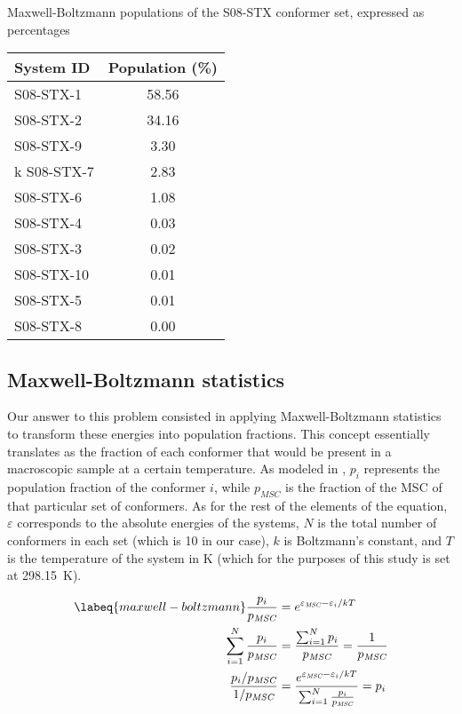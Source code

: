 \begin{margintable}
    \centering
    \caption[Maxwell-Boltzmann populations of S08-STX]{Maxwell-Boltzmann populations of the S08-STX conformer set, expressed as percentages}
    \begin{tabular}{@{}l
                       S[table-format=2.2]@{}}
        \toprule
        System ID & {Population (\si{\percent})} \\
        \midrule
        S08-STX-1 & 58.56 \\
        S08-STX-2 & 34.16 \\
        S08-STX-9 & 3.30 \\k
        S08-STX-7 & 2.83 \\
        S08-STX-6 & 1.08 \\
        S08-STX-4 & 0.03 \\
        S08-STX-3 & 0.02 \\
        S08-STX-10 & 0.01 \\
        S08-STX-5 & 0.01 \\
        S08-STX-8 & 0.00 \\
    \end{tabular}
\end{margintable}

\subsection{Maxwell-Boltzmann statistics}
Our answer to this problem consisted in applying Maxwell-Boltzmann statistics to transform these energies into population fractions.
This concept essentially translates as the fraction of each conformer that would be present in a macroscopic sample at a certain temperature.
As modeled in , $p_i$ represents the population fraction of the conformer $i$, while $p_\textit{MSC}$ is the fraction of the MSC of that particular set of conformers.
As for the rest of the elements of the equation, $\varepsilon$ corresponds to the absolute energies of the systems, $N$ is the total number of conformers in each set (which is 10 in our case), $k$ is Boltzmann's constant, and $T$ is the temperature of the system in \si{\kelvin} (which for the purposes of this study is set at \SI{298.15}{\kelvin}).

\begin{align}
\begin{split}
    \labeq{maxwell-boltzmann}
    \frac{p_i}{p_\textit{MSC}}&=e^{\varepsilon_\textit{MSC}-\varepsilon_i/kT} \\
    \sum_{i=1}^{N}\frac{p_i}{p_\textit{MSC}}&=\frac{\sum_{i=1}^{N}p_i}{p_\textit{MSC}}=\frac{1}{p_\textit{MSC}} \\
    \frac{p_i/p_\textit{MSC}}{1/p_\textit{MSC}}&=\frac{e^{\varepsilon_\textit{MSC}-\varepsilon_i/kT}}{\sum_{i=1}^{N}\frac{p_i}{p_\textit{MSC}}}=p_i \\
\end{split}
\end{align}

